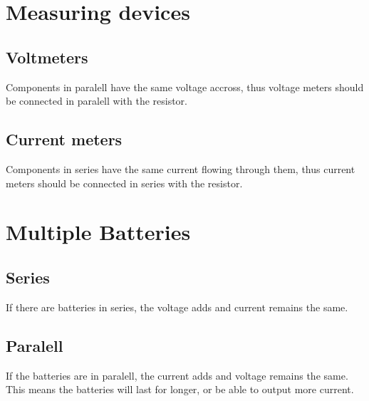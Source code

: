 \documentclass[11pt,twoside]{article}
\begin{document}
	\section{Measuring devices}
		\subsection{Voltmeters}
			 Components in paralell have the same voltage accross, thus voltage meters should be connected in paralell with the resistor.
		\subsection{Current meters}
			Components in series have the same current flowing through them, thus current meters should be connected in series with the resistor.
	\section{Multiple Batteries}
		\subsection{Series}
			If there are batteries in series, the voltage adds and current remains the same.
		\subsection{Paralell}
			If the batteries are in paralell, the current adds and voltage remains the same. This means the batteries will last for longer, or be able to output more current.
\end{document}
